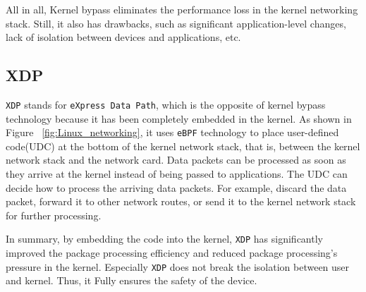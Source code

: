 All in all, Kernel bypass eliminates the performance 
loss in the kernel networking stack. Still, it also has 
drawbacks, such as significant application-level changes, 
lack of isolation between devices and applications, etc.

\subsection{XDP}
\verb|XDP| stands for \verb|eXpress Data Path|, which is the opposite of 
kernel bypass technology because it has been completely embedded 
in the kernel. As shown in Figure ~\ref{fig:Linux_networking}, 
it uses \verb|eBPF| technology to place user-defined code(UDC) at the 
bottom of the kernel network stack, that is, between the kernel 
network stack and the network card. 
Data packets can be processed as soon as they arrive at the kernel 
instead of being passed to applications. The UDC can decide how to 
process the arriving data packets. For example, 
discard the data packet, forward it to other network 
routes, or send it to the kernel network stack for further processing.

In summary, by embedding the code into the kernel, 
\verb|XDP| has significantly improved the package processing 
efficiency and reduced package processing's pressure 
in the kernel. Especially \verb|XDP| does not break the isolation 
between user and kernel. Thus, it Fully ensures the safety of the device.

\cleardoublepage

